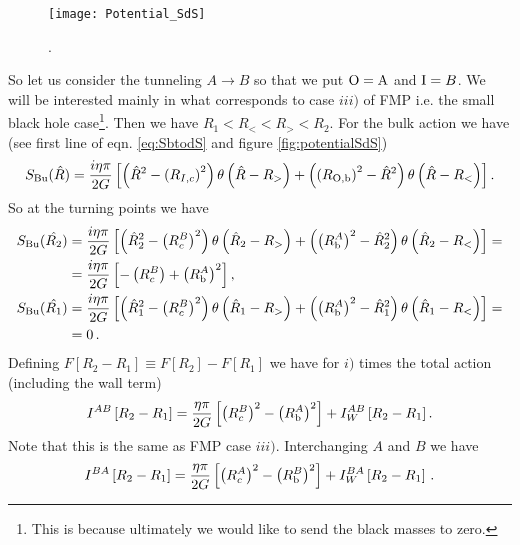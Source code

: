 \documentclass[a4paper,11pt]{article}
\numberwithin{equation}{section}
\newcommand{\be}{\begin{equation}}
\newcommand{\ee}{\end{equation}}
\numberwithin{equation}{section}
\begin{document}
\begin{figure}[h!] 
\begin{center} 
\texttt{[image: Potential\_SdS]}
\caption{\footnotesize{.} \label{fig:potentialSdS}}
\end{center} 
\end{figure}

So let us consider the tunneling $A\rightarrow B$ so that we put
${\rm O=A}$ and ${\rm I}=B$. We will be interested mainly in what
corresponds to case $iii)$ of FMP i.e. the small black hole case\footnote{This is because ultimately we would like to send the black masses to zero.}. Then we have $R_{1}<R_{<}<R_{>}<R_{2}$. For the bulk action we
have (see first line of eqn. \eqref{eq:SbtodS} and figure \eqref{fig:potentialSdS})
\begin{equation}
S_{{\rm Bu}}(\hat{R})=\frac{i\eta\pi}{2G}\left[\left(\hat{R}^{2}-\left(R_{I,c}\right)^{2}\right)\theta\left(\hat{R}-R_{>}\right)+\left(\left(R_{{\rm O,{ b}}}\right)^{2}-\hat{R}^{2}\right)\theta\left(\hat{R}-R_{<}\right)\right].\label{eq:SdStoSdS}
\end{equation}
So at the turning points we have
\begin{align*}
S_{{\rm Bu}}(\hat{R_{2}}) & =\frac{i\eta\pi}{2G}\left[\left(\hat{R}_{2}^{2}-\left(R_{c}^{B}\right)^{2}\right)\theta\left(\hat{R}_{2}-R_{>}\right)+\left(\left(R_{{\rm {\rm b}}}^{A}\right)^{2}-\hat{R}_{2}^{2}\right)\theta\left(\hat{R}_{2}-R_{<}\right)\right] =\\
 & =\frac{i\eta\pi}{2G}\left[-\left(R_{c}^{B}\right)+\left(R_{{\rm {\rm b}}}^{A}\right)^{2}\right],\\
S_{{\rm Bu}}(\hat{R_{1}}) & =\frac{i\eta\pi}{2G}\left[\left(\hat{R}_{1}^{2}-\left(R_{c}^{B}\right)^{2}\right)\theta\left(\hat{R}_{1}-R_{>}\right)+\left(\left(R_{{\rm {\rm b}}}^{A}\right)^{2}-\hat{R}_{1}^{2}\right)\theta\left(\hat{R}_{1}-R_{<}\right)\right] =\\
 & =0 \,.
\end{align*}
Defining $F\left[R_{2}-R_{1}\right]\equiv F\left[R_{2}\right]-F\left[R_{1}\right]$
we have for $i)$ times the total action (including the wall term)
\begin{equation}
I^{AB}\left[R_{2}-R_{1}\right]=\frac{\eta\pi}{2G}\left[\left(R_{c}^{B}\right)^{2}-\left(R_{{\rm {\rm b}}}^{A}\right)^{2}\right]+I_{W}^{AB}\left[R_{2}-R_{1}\right].\label{eq:IAB}
\end{equation}
Note that this is the same as FMP case $iii)$. Interchanging $A$ and
$B$ we have
\be
I^{BA}\left[R_{2}-R_{1}\right]=\frac{\eta\pi}{2G}\left[\left(R_{c}^{A}\right)^{2}-\left(R_{{\rm {\rm b}}}^{B}\right)^{2}\right]+I_{W}^{BA}\left[R_{2}-R_{1}\right] \,.
\ee
\end{document}
